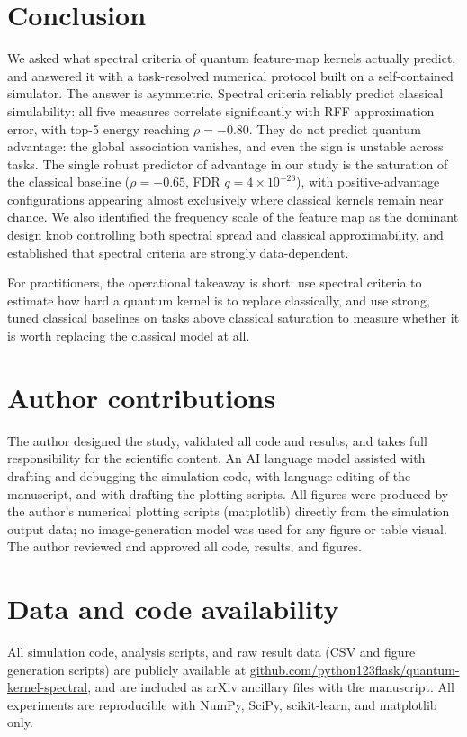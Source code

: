 \documentclass[aps,pra,preprint]{revtex4-2}
\begin{document}
\section{Conclusion}
\label{sec:conclusion}

We asked what spectral criteria of quantum feature-map kernels actually predict, and
answered it with a task-resolved numerical protocol built on a self-contained
simulator. The answer is asymmetric. Spectral criteria reliably predict classical
simulability: all five measures correlate significantly with RFF approximation error,
with top-5 energy reaching $\rho=-0.80$. They do not predict quantum advantage: the
global association vanishes, and even the sign is unstable across tasks. The single
robust predictor of advantage in our study is the saturation of the classical baseline
($\rho=-0.65$, FDR $q=4\times10^{-26}$), with positive-advantage configurations
appearing almost exclusively where classical kernels remain near chance. We also
identified the frequency scale of the feature map as the dominant design knob
controlling both spectral spread and classical approximability, and established that
spectral criteria are strongly data-dependent.

For practitioners, the operational takeaway is short: use spectral criteria to
estimate how hard a quantum kernel is to replace classically, and use strong, tuned
classical baselines on tasks above classical saturation to measure whether it is worth
replacing the classical model at all.

\section*{Author contributions}
The author designed the study, validated all code and results, and takes full
responsibility for the scientific content. An AI language model assisted with
drafting and debugging the simulation code, with language editing of the manuscript,
and with drafting the plotting scripts. All figures were produced by the author's
numerical plotting scripts (matplotlib) directly from the simulation output data;
no image-generation model was used for any figure or table visual. The author
reviewed and approved all code, results, and figures.

\section*{Data and code availability}
All simulation code, analysis scripts, and raw result data (CSV and figure
generation scripts) are publicly available at
\href{https://github.com/python123flask/quantum-kernel-spectral}{github.com/python123flask/quantum-kernel-spectral},
and are included as arXiv ancillary files with the manuscript. All experiments are
reproducible with NumPy, SciPy, scikit-learn, and matplotlib only.



\end{document}
